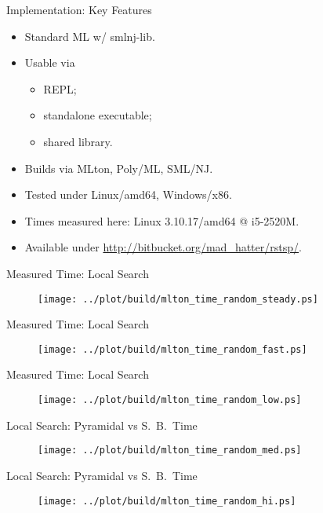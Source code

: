 \documentclass[
  size=8pt,
  style=klope,
  paper=screen,
  pauseslide,
  nopagebreaks,
  hlsections,
  fleqn
]{powerdot}
\begin{document}
\begin{slide}[toc=Key Features]{Implementation: Key Features}
  \begin{itemize}
  \item
  Standard ML w/ smlnj-lib.
  \item
  Usable via
  \begin{itemize}
    \item REPL;
    \item standalone executable;
    \item shared library.
  \end{itemize}
  \item
  Builds via MLton, Poly/ML, SML/NJ.
  \item
  Tested under Linux/{\ttfamily amd64}, Windows/{\ttfamily x86}.
  \item
    Times measured here:
    Linux 3.10.17/{\ttfamily amd64} @ i5-2520M.
  \item
  Available under
    \url{http://bitbucket.org/mad_hatter/rstsp/}.
  \end{itemize}
\end{slide}

\begin{slide}[toc=Benchmarks: Time]{Measured Time: Local Search}
  \begin{figure}[H]
    \centering
      \texttt{[image: ../plot/build/mlton\_time\_random\_steady.ps]}
  \end{figure}
\end{slide}
\begin{slide}[toc=]{Measured Time: Local Search}
  \begin{figure}[H]
    \centering
      \texttt{[image: ../plot/build/mlton\_time\_random\_fast.ps]}
  \end{figure}
\end{slide}
\begin{slide}[toc=]{Measured Time: Local Search}
  \begin{figure}[H]
    \centering
      \texttt{[image: ../plot/build/mlton\_time\_random\_low.ps]}
  \end{figure}
\end{slide}
\begin{slide}[toc=]{Local Search: Pyramidal vs S.\ B.\ Time}
  \begin{figure}[H]
    \centering
      \texttt{[image: ../plot/build/mlton\_time\_random\_med.ps]}
  \end{figure}
\end{slide}
\begin{slide}[toc=]{Local Search: Pyramidal vs S.\ B.\ Time}
  \begin{figure}[H]
    \centering
      \texttt{[image: ../plot/build/mlton\_time\_random\_hi.ps]}
  \end{figure}
\end{slide}
\end{document}
